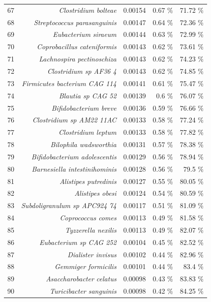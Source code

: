 \documentclass{article}
\begin{document}
\begin{table}
\begin{centering}
\begin{tabular}{|r|r|r|r|r|}
  67 & \textit{Clostridium bolteae} & 0.00154 & 0.67 \% & 71.72 \% \\
  68 & \textit{Streptococcus parasanguinis} & 0.00147 & 0.64 \% & 72.36 \% \\
  69 & \textit{Eubacterium siraeum} & 0.00144 & 0.63 \% & 72.99 \% \\
  70 & \textit{Coprobacillus cateniformis} & 0.00143 & 0.62 \% & 73.61 \% \\
  71 & \textit{Lachnospira pectinoschiza} & 0.00143 & 0.62 \% & 74.23 \% \\
  72 & \textit{Clostridium sp AF36 4} & 0.00143 & 0.62 \% & 74.85 \% \\
  73 & \textit{Firmicutes bacterium CAG 114} & 0.00141 & 0.61 \% & 75.47 \% \\
  74 & \textit{Blautia sp CAG 52} & 0.00139 & 0.6 \% & 76.07 \% \\
  75 & \textit{Bifidobacterium breve} & 0.00136 & 0.59 \% & 76.66 \% \\
  76 & \textit{Clostridium sp AM22 11AC} & 0.00133 & 0.58 \% & 77.24 \% \\
  77 & \textit{Clostridium leptum} & 0.00133 & 0.58 \% & 77.82 \% \\
  78 & \textit{Bilophila wadsworthia} & 0.00131 & 0.57 \% & 78.38 \% \\
  79 & \textit{Bifidobacterium adolescentis} & 0.00129 & 0.56 \% & 78.94 \% \\
  80 & \textit{Barnesiella intestinihominis} & 0.00128 & 0.56 \% & 79.5 \% \\
  81 & \textit{Alistipes putredinis} & 0.00127 & 0.55 \% & 80.05 \% \\
  82 & \textit{Alistipes obesi} & 0.00124 & 0.54 \% & 80.59 \% \\
  83 & \textit{Subdoligranulum sp APC924 74} & 0.00117 & 0.51 \% & 81.09 \% \\
  84 & \textit{Coprococcus comes} & 0.00113 & 0.49 \% & 81.58 \% \\
  85 & \textit{Tyzzerella nexilis} & 0.00113 & 0.49 \% & 82.07 \% \\
  86 & \textit{Eubacterium sp CAG 252} & 0.00104 & 0.45 \% & 82.52 \% \\
  87 & \textit{Dialister invisus} & 0.00102 & 0.44 \% & 82.96 \% \\
  88 & \textit{Gemmiger formicilis} & 0.00101 & 0.44 \% & 83.4 \% \\
  89 & \textit{Asaccharobacter celatus} & 0.00098 & 0.43 \% & 83.83 \% \\
  90 & \textit{Turicibacter sanguinis} & 0.00098 & 0.42 \% & 84.25 \% \\

\end{tabular}
\end{centering}
\end{table}
\end{document}

